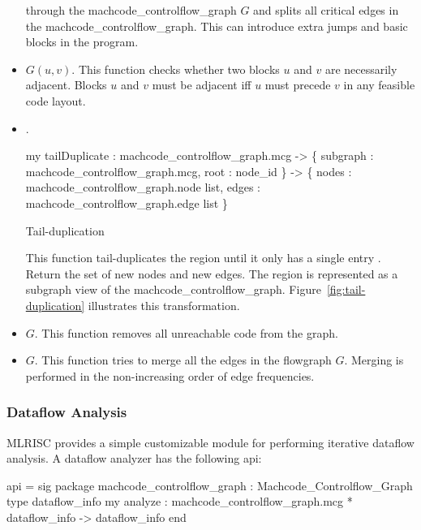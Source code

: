 \begin{itemize}
        through the machcode_controlflow_graph $G$ and splits
      all critical edges in the machcode_controlflow_graph.
      This can introduce extra jumps and basic blocks in the program.
  \item  {} $G (u,v)$.   This function
      checks whether two blocks $u$ and $v$ are necessarily adjacent.
      Blocks $u$ and $v$ must be adjacent iff $u$ must precede $v$
      in any feasible code layout.
  \item  {}.  
   \begin{SML}
    my tailDuplicate : machcode_controlflow_graph.mcg -> \{ subgraph : machcode_controlflow_graph.mcg, root : node_id \} 
                                -> \{ nodes : machcode_controlflow_graph.node list, 
                                     edges : machcode_controlflow_graph.edge list \} 
   \end{SML}
\begin{Figure}
\begin{boxit}
\end{boxit}
\label{fig:tail-duplication} 
\caption{Tail-duplication}
\end{Figure}

      This function tail-duplicates the region 
      until it only has a single entry .
      Return the set of new nodes and new edges.  
      The region is represented as a subgraph view of the machcode_controlflow_graph.
      Figure~\ref{fig:tail-duplication} illustrates 
      this transformation.

  \item  {} $G$. This function
          removes all unreachable code  from the graph.
  \item  {} $G$.  This function tries to merge all
         the edges in the flowgraph $G$.  Merging is performed in the
         non-increasing order of edge frequencies. 
\end{itemize}

\subsubsection{Dataflow Analysis}
MLRISC provides a simple customizable module for performing
iterative dataflow analysis.   A dataflow analyzer
has the following api:

\begin{SML}
 api  = sig
   package machcode_controlflow_graph : Machcode_Controlflow_Graph
   type dataflow_info
   my analyze : machcode_controlflow_graph.mcg * dataflow_info -> dataflow_info
 end
\end{SML}

